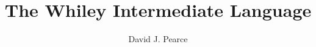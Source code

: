 \documentclass[10pt]{book}
\title{\Huge {\bf The Whiley Intermediate Language}}
\author{David J. Pearce}
\begin{document}

\tableofcontents



\printglossaries



\end{document}
